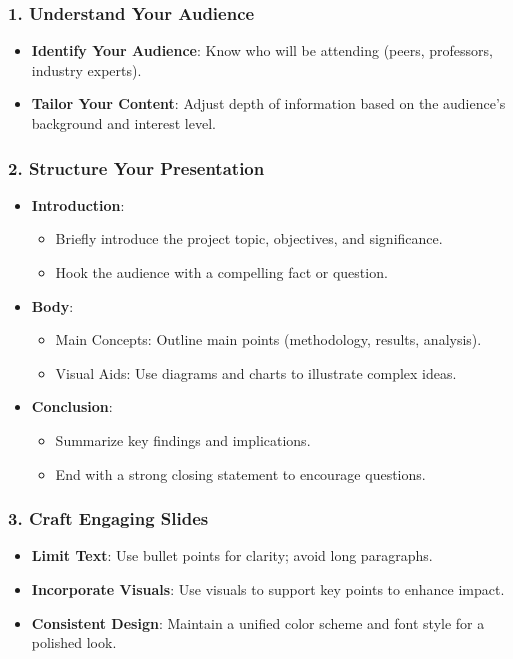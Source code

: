 \documentclass[aspectratio=169]{beamer}
\begin{document}
\begin{frame}[fragile]
    \frametitle{1. Understand Your Audience}
    \begin{itemize}
        \item \textbf{Identify Your Audience}: Know who will be attending (peers, professors, industry experts).
        \item \textbf{Tailor Your Content}: Adjust depth of information based on the audience's background and interest level.
    \end{itemize}
\end{frame}

\begin{frame}[fragile]
    \frametitle{2. Structure Your Presentation}
    \begin{itemize}
        \item \textbf{Introduction}:
            \begin{itemize}
                \item Briefly introduce the project topic, objectives, and significance.
                \item Hook the audience with a compelling fact or question.
            \end{itemize}
        \item \textbf{Body}:
            \begin{itemize}
                \item Main Concepts: Outline main points (methodology, results, analysis).
                \item Visual Aids: Use diagrams and charts to illustrate complex ideas.
            \end{itemize}
        \item \textbf{Conclusion}:
            \begin{itemize}
                \item Summarize key findings and implications.
                \item End with a strong closing statement to encourage questions.
            \end{itemize}
    \end{itemize}
\end{frame}

\begin{frame}[fragile]
    \frametitle{3. Craft Engaging Slides}
    \begin{itemize}
        \item \textbf{Limit Text}: Use bullet points for clarity; avoid long paragraphs.
        \item \textbf{Incorporate Visuals}: Use visuals to support key points to enhance impact.
        \item \textbf{Consistent Design}: Maintain a unified color scheme and font style for a polished look.
    \end{itemize}
\end{frame}
\end{document}
